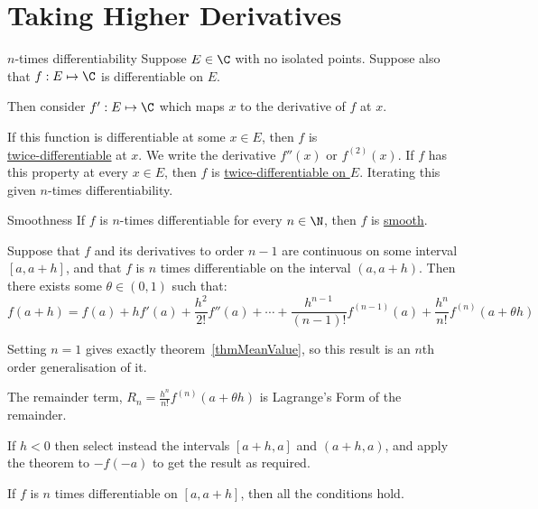 \documentclass[../Main.tex]{subfiles}
\begin{document}
\section{Taking Higher Derivatives}
\begin{definition}{$n$-times differentiability}
    Suppose $E \in \C$ with no isolated points. Suppose also that $f : E \mapsto \C$ is differentiable on $E$.\par
    Then consider $f' : E \mapsto \C$ which maps $x$ to the derivative of $f$ at $x$.\par
    If this function is differentiable at some $x \in E$, then $f$ is \\\underline{twice-differentiable} at $x$. We write the derivative $f''(x)$ or $f^{(2)}(x)$. If $f$ has this property at every $x \in E$, then $f$ is \underline{twice-differentiable on $E$}. Iterating this given $n$-times differentiability.
\end{definition}
\begin{definition}{Smoothness}
    If $f$ is $n$-times differentiable for every $n \in \N$, then $f$ is \underline{smooth}.
\end{definition}
\begin{theorem}
    Suppose that $f$ and its derivatives to order $n - 1$ are continuous on some interval $[a, a + h]$, and that $f$ is $n$ times differentiable on the interval $(a, a + h)$. Then there exists some $\theta \in (0, 1)$ such that:
    \begin{equation*}
        f(a + h) = f(a) + hf'(a) + \frac{h^2}{2!} f''(a) + \cdots + \frac{h^{n-1}}{(n-1)!} f^{(n-1)}(a) + \frac{h^n}{n!} f^{(n)}(a + \theta h)
    \end{equation*}
    \label{thmTaylorsI}
\end{theorem}
\begin{remarks}
    \item Setting $n = 1$ gives exactly theorem~\ref{thmMeanValue}, so this result is an $n$th order generalisation of it.
    \item The remainder term, $R_n = \frac{h^n}{n!} f^{(n)}(a + \theta h)$ is Lagrange's Form of the remainder.
    \item If $h < 0$ then select instead the intervals $[a + h, a]$ and $(a + h, a)$, and apply the theorem to $-f(-a)$ to get the result as required.
    \item If $f$ is $n$ times differentiable on $[a, a + h]$, then all the conditions hold.
\end{remarks}
\end{document}
